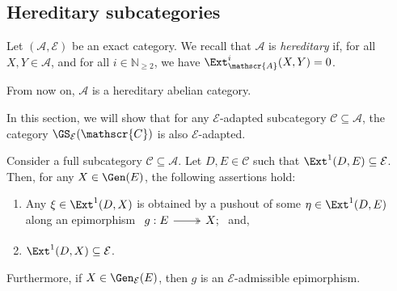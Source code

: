 \subsection{Hereditary subcategories}
\label{ss:Her} Let $(\mathscr{A},\mathcal{E})$ be an exact category. We recall that $\mathscr{A}$ is \emph{hereditary} if, for all $X,Y \in \mathscr{A}$, and for all $i \in \mathbb{N}_{\geqslant 2}$, we have $\Ext_\mathscr{A}^i(X,Y) = 0$. 

\begin{conv} \label{conv:hereditary}
    From now on, $\mathscr{A}$ is a hereditary abelian category.
\end{conv}

In this section, we will show that for any $\mathcal{E}$-adapted subcategory $\mathscr{C} \subseteq \mathscr{A}$, the category $\GS_\mathcal{E}(\mathscr{C})$ is also $\mathcal{E}$-adapted.

\begin{lemma}
\label{lem:GenlocalEadapt}
Consider a full subcategory $\mathscr{C} \subseteq \mathscr{A}$. Let $D,E \in \mathscr{C}$ such that $\Ext^1(D,E) \subseteq \mathcal{E}$. Then, for any $X \in \Gen(E)$, the following assertions hold:
\begin{enumerate}[label=$(\alph*)$,itemsep=1mm]
   \item Any $\xi \in \Ext^1(D,X)$ is obtained by a pushout of some $\eta \in \Ext^1(D,E)$ along an epimorphism $ \begin{tikzcd}
	 g : E & X;
	\arrow[two heads,from=1-1, to=1-2]
   \end{tikzcd}$ and,
   \item $\Ext^1(D,X) \subseteq \mathcal{E}$.
\end{enumerate}
Furthermore, if $X \in \Gen_\mathcal{E}(E)$, then $g$ is an $\mathcal{E}$-admissible epimorphism.   
\end{lemma}

